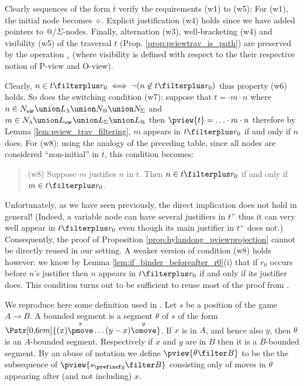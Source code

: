 Clearly sequences of the form $\overline{t}$ verify the requirements (w1) to (w5): For (w1), the initial node
becomes $\diamond$. Explicit justification (w4) holds since we have added pointers to @/$\Sigma$-nodes.
Finally, alternation (w3), well-bracketing (w4) and visibility (w5) of the traversal $t$ (Prop.
\ref{prop:pviewtrav_is_path}) are preserved by the operation $\overline{\_}$
(where visibility is defined with respect to the their respective
notion of P-view and O-view).

Clearly, $n \in t\filterplus r_0 \iff \neg ( n \not\in t\filterplus
r_0)$ thus property (w6) holds. So does the switching condition
(w7): suppose that $t = \cdot m \cdot n$ where $n\in N_{\sf var}
\union L_\lambda \union N_@ \union N_\Sigma$ and $m \in N_\lambda
\union L_{\sf var} \union L_\Sigma \union L_@$ then $\pview{t} =
\ldots \cdot m \cdot n$ therefore by Lemma
\ref{lem:pview_trav_filtering}, $m$ appears in $t\filterplus r_0$ if
and only if $n$ does.
For (w8): using the analogy of the preceding table, since all nodes
are considered ``non-initial'' in $\overline{t}$, this condition
becomes:
\begin{quote}
 (w8) Suppose $m$ justifies $n$ in $\overline{t}$. Then $n \in t\filterplus r_0$ if and only if $m\in t\filterplus r_0$.
\end{quote}
Unfortunately, as we have seen previously, the direct implication does not hold in general! (Indeed, a variable node can have several
justifiers in $t^+$ thus it can very well appear in $t\filterplus r_0$ even though its main justifier in $t^+$ does not.) Consequently, the proof of Proposition \ref{prop:hylandong_pviewprojection} cannot be
directly reused in our setting. A weaker version of condition (w8) holds however: we know by Lemma \ref{lem:if_binder_beforeafter_r0}(i) that if $r_0$ occurs before $n$'s justifier then $n$ appears in
$t\filterplus r_0$ if and only if its justifier does.
This condition turns out to be sufficient to reuse most of the proof from \cite{hylandong_pcf}.

We reproduce here some definition used in \cite{hylandong_pcf}. Let
$s$ be a position of the game $A\rightarrow B$. A bounded segment is
a segment $\theta$ of $s$ of the form
$\Pstr[0.6cm]{(x){\stackrel{x}\pmove} \ldots
(y-x){\stackrel{y}\omove}}$. If $x$ is in $A$, and hence also $y$,
then $\theta$ is an $A$-bounded segment. Respectively if $x$ and $y$
are in $B$ then it is a $B$-bounded segment. By an abuse of notation
we define $\pview{\theta \filter B}$ to be the the subsequence of
$\pview{s_{\prefixof y} \filter B}$ consisting only of moves in
$\theta$ appearing after (and not including) $x$.

